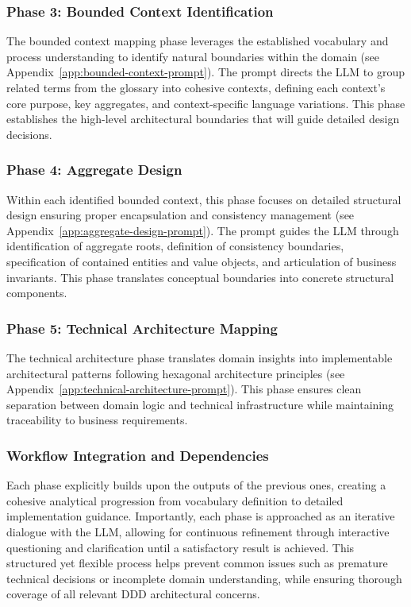 \subsubsection{Phase 3: Bounded Context Identification}
The bounded context mapping phase leverages the established vocabulary and process understanding to identify natural boundaries within the domain (see Appendix~\ref{app:bounded-context-prompt}). The prompt directs the LLM to group related terms from the glossary into cohesive contexts, defining each context's core purpose, key aggregates, and context-specific language variations. This phase establishes the high-level architectural boundaries that will guide detailed design decisions.

\subsubsection{Phase 4: Aggregate Design}
Within each identified bounded context, this phase focuses on detailed structural design ensuring proper encapsulation and consistency management (see Appendix~\ref{app:aggregate-design-prompt}). The prompt guides the LLM through identification of aggregate roots, definition of consistency boundaries, specification of contained entities and value objects, and articulation of business invariants. This phase translates conceptual boundaries into concrete structural components.

\subsubsection{Phase 5: Technical Architecture Mapping}
The technical architecture phase translates domain insights into implementable architectural patterns following hexagonal architecture principles (see Appendix~\ref{app:technical-architecture-prompt}). This phase ensures clean separation between domain logic and technical infrastructure while maintaining traceability to business requirements.

\subsubsection{Workflow Integration and Dependencies}
Each phase explicitly builds upon the outputs of the previous ones, creating a cohesive analytical progression from vocabulary definition to detailed implementation guidance. Importantly, each phase is approached as an iterative dialogue with the LLM, allowing for continuous refinement through interactive questioning and clarification until a satisfactory result is achieved. This structured yet flexible process helps prevent common issues such as premature technical decisions or incomplete domain understanding, while ensuring thorough coverage of all relevant DDD architectural concerns.

